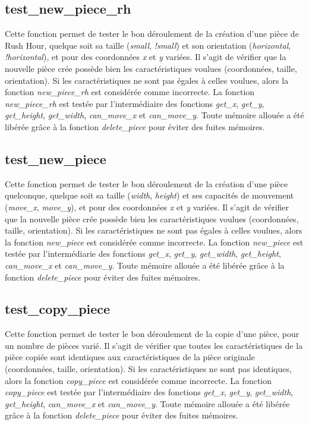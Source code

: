 \documentclass{report}
\begin{document}
\subsection{test\_new\_piece\_rh}
Cette fonction permet de tester le bon déroulement de la création d'une pièce de Rush Hour, quelque soit sa taille (\emph{small}, \emph{!small}) et son orientation (\emph{horizontal}, \emph{!horizontal}), et pour des coordonnées \emph{x} et \emph{y} variées. Il s'agit de vérifier que la nouvelle pièce crée possède bien les caractéristiques voulues (coordonnées, taille, orientation). Si les caractéristiques ne sont pas égales à celles voulues, alors la fonction \emph{new\_piece\_rh} est considérée comme incorrecte. La fonction \emph{new\_piece\_rh} est testée par l'intermédiaire des fonctions  \emph{get\_x}, \emph{get\_y}, \emph{get\_height}, \emph{get\_width}, \emph{can\_move\_x} et \emph{can\_move\_y}. Toute mémoire allouée a été libérée grâce à la fonction \emph{delete\_piece} pour éviter des fuites mémoires.
\subsection{test\_new\_piece}
Cette fonction permet de tester le bon déroulement de la création d'une pièce quelconque, quelque soit sa taille (\emph{width}, \emph{height}) et ses capacités de mouvement (\emph{move\_x}, \emph{move\_y}), et pour des coordonnées \emph{x} et \emph{y} variées. Il s'agit de vérifier que la nouvelle pièce crée possède bien les caractéristiques voulues (coordonnées, taille, orientation). Si les caractéristiques ne sont pas égales à celles voulues, alors la fonction \emph{new\_piece} est considérée comme incorrecte. La fonction \emph{new\_piece} est testée par l'intermédiarie des fonctions \emph{get\_x}, \emph{get\_y}, \emph{get\_width}, \emph{get\_height}, \emph{can\_move\_x} et \emph{can\_move\_y}. Toute mémoire allouée a été libérée grâce à la fonction \emph{delete\_piece} pour éviter des fuites mémoires.
\subsection{test\_copy\_piece}
Cette fonction permet de tester le bon déroulement de la copie d'une pièce, pour un nombre de pièces varié. Il s'agit de vérifier que toutes les caractéristiques de la pièce copiée sont identiques aux caractéristiques de la pièce originale (coordonnées, taille, orientation). Si les caractéristiques ne sont pas identiques, alors la fonction \emph{copy\_piece} est considérée comme incorrecte. La fonction \emph{copy\_piece} est testée par l'intermédiaire des fonctions \emph{get\_x}, \emph{get\_y}, \emph{get\_width}, \emph{get\_height}, \emph{can\_move\_x} et \emph{can\_move\_y}. Toute mémoire allouée a été libérée grâce à la fonction \emph{delete\_piece} pour éviter des fuites mémoires.
\end{document}
